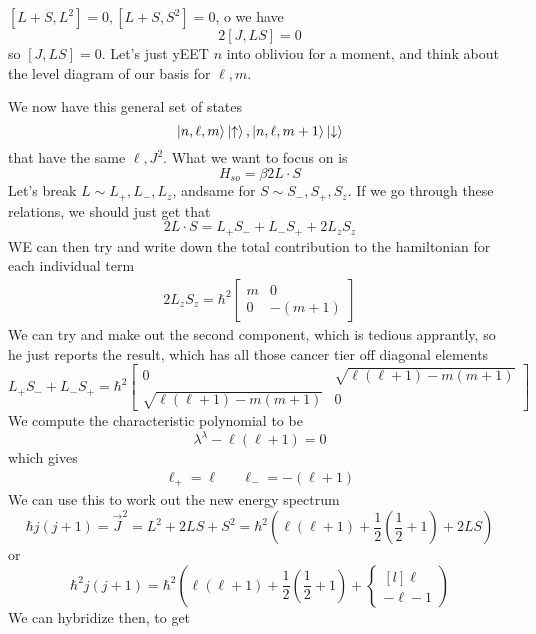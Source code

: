 \documentclass{article}
\theoremstyle{definition}
\begin{document}
$[L+S,L^2]=0,[L+S,S^2]=0$, o we have \begin{equation} 2[J,LS]=0 \end{equation} so $[J,LS]=0$. Let's just yEET $n$ into obliviou for a moment, and think about the level diagram of our basis for $\ell,m$. \begin{center}  \end{center} We now have this general set of states \begin{equation} \ket{n,\ell,m}\ket{\uparrow},\ket{n,\ell,m+1}\ket{\downarrow} \end{equation} that have the same $\ell,J^2$. What we want to focus on is \begin{equation} H_{so}=\beta2L\cdot S \end{equation} Let's break $L\sim L_+,L_-,L_z$, andsame for $S\sim S_-,S_+,S_z$. If we go through these relations, we should just get that \begin{equation} 2L\cdot S=L_+S_-+L_-S_++2L_zS_z \end{equation} WE can then try and write down the total contribution to the hamiltonian for each individual term \begin{align} 2L_zS_z=\hbar^2\begin{bmatrix} m&0\\0&-(m+1)\end{bmatrix} \end{align} We can try and make out the second component, which is tedious apprantly, so he just reports the result, which has all those cancer tier off diagonal elements \begin{equation} L_+S_-+L_-S_+=\hbar^2 \begin{bmatrix} 0 & \sqrt{\ell(\ell+1)-m(m+1)}\\ \sqrt{\ell(\ell+1)-m(m+1)} & 0 \end{bmatrix} \end{equation} We compute the characteristic polynomial to be \begin{equation} \lambda^\lambda-\ell(\ell+1)=0 \end{equation} which gives \begin{align} \ell_+=\ell && \ell_-=-(\ell+1) \end{align} We can use this to work out the new energy spectrum \begin{equation} \hbar j(j+1)=\vec{J}^2=L^2+2LS+S^2=\hbar^2\left(\ell(\ell+1)+\frac{1}{2}\left(\frac{1}{2}+1\right)+2LS\right) \end{equation} or \begin{equation} \hbar^2 j(j+1)=\hbar^2\left(\ell(\ell+1)+\frac{1}{2}\left(\frac{1}{2}+1\right)+\left\{ \begin{matrix*}[l] \ell\\-\ell-1 \end{matrix*} \right.\right) \end{equation} We can hybridize then, to get 
\end{document}
